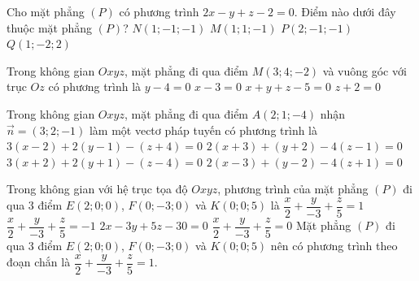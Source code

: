 \begin{vd}%
    Cho mặt phẳng $(P)$ có phương trình $2x-y+z-2=0$. Điểm nào dưới đây thuộc mặt phẳng $(P)$?
    \choice
    {\True $N(1;-1;-1)$}
    {$M(1;1;-1)$}
    {$P(2;-1;-1)$}
    {$Q(1;-2;2)$}
\end{vd}
\begin{vd}[TN2024-102]%
    Trong không gian $Oxyz$, mặt phẳng đi qua điểm $M(3;4;-2)$ và vuông góc với trục $Oz$ có phương trình là
    \choice
    {$y-4=0$}
    {$x-3=0$}
    {$x+y+z-5=0$}
    {\True $z+2=0$}
\end{vd}
\begin{vd}[TN2025-0101]%
    Trong không gian $Oxyz$, mặt phẳng đi qua điểm $A(2;1;-4)$ nhận $\overrightarrow{n}=(3;2;-1)$ làm một vectơ pháp tuyến có phương trình là
    \choice
    {\True $3(x-2)+2(y-1)-(z+4)=0$}
    {$2(x+3)+(y+2)-4(z-1)=0$}
    {$3(x+2)+2(y+1)-(z-4)=0$}
    {$2(x-3)+(y-2)-4(z+1)=0$}
\end{vd}
\begin{vd}%
    Trong không gian với hệ trục tọa độ $Oxyz$, phương trình của mặt phẳng $(P)$ đi qua 3 điểm $E(2;0;0)$, $F(0;-3;0)$ và $K(0;0;5)$ là
    \choice
    {\True $\dfrac{x}{2}+\dfrac{y}{-3}+\dfrac{z}{5}=1$}
    {$\dfrac{x}{2}+\dfrac{y}{-3}+\dfrac{z}{5}=-1$}
    {$2x-3y+5z-30=0$}
    {$\dfrac{x}{2}+\dfrac{y}{-3}+\dfrac{z}{5}=0$}
    \loigiai
    {Mặt phẳng $(P)$ đi qua $3$ điểm $E(2;0;0)$, $F(0;-3;0)$ và $K(0;0;5)$ nên có phương trình theo đoạn chắn là $\dfrac{x}{2}+\dfrac{y}{-3}+\dfrac{z}{5}=1$.
    }
\end{vd}
